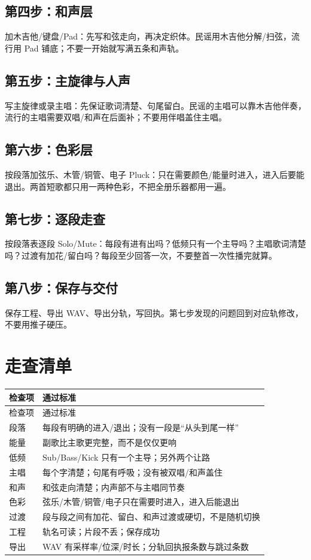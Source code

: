 \subsection*{第四步：和声层}
加木吉他/键盘/Pad：先写和弦走向，再决定织体。民谣用木吉他分解/扫弦，流行用 Pad 铺底；不要一开始就写满五条和声轨。

\subsection*{第五步：主旋律与人声}
写主旋律或录主唱：先保证歌词清楚、句尾留白。民谣的主唱可以靠木吉他伴奏，流行的主唱需要双唱/和声在后面补；不要用伴唱盖住主唱。

\subsection*{第六步：色彩层}
按段落加弦乐、木管/铜管、电子 Pluck：只在需要颜色/能量时进入，进入后要能退出。两首短歌都只用一两种色彩，不把全册乐器都用一遍。

\subsection*{第七步：逐段走查}
按段落表逐段 Solo/Mute：每段有进有出吗？低频只有一个主导吗？主唱歌词清楚吗？过渡有加花/留白吗？每段至少回答一次，不要整首一次性播完就算。

\subsection*{第八步：保存与交付}
保存工程、导出 WAV、导出分轨，写回执。第七步发现的问题回到对应轨修改，不要用推子硬压。

\section{走查清单}
\label{sec:walkthrough-checklist}

\begin{longtable}{p{}p{}}
\toprule
检查项 & 通过标准 \\
\midrule
\endfirsthead
\toprule
检查项 & 通过标准 \\
\midrule
\endhead
段落 & 每段有明确的进入/退出；没有一段是“从头到尾一样” \\
能量 & 副歌比主歌更完整，而不是仅仅更响 \\
低频 & Sub/Bass/Kick 只有一个主导；另外两个让路 \\
主唱 & 每个字清楚；句尾有呼吸；没有被双唱/和声盖住 \\
和声 & 和弦走向清楚；内声部不与主唱同节奏 \\
色彩 & 弦乐/木管/铜管/电子只在需要时进入，进入后能退出 \\
过渡 & 段与段之间有加花、留白、和声过渡或硬切，不是随机切换 \\
工程 & 轨名可读；片段不丢；保存成功 \\
导出 & WAV 有采样率/位深/时长；分轨回执报条数与跳过条数 \\
\bottomrule
\end{longtable}


